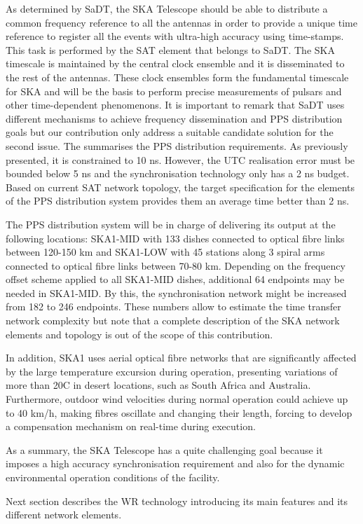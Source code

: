 As determined by SaDT, the SKA Telescope should be able to distribute a common frequency reference to all the antennas in order to provide a unique time reference to register all the events with ultra-high accuracy using time-stamps. This task is performed by the SAT element that belongs to SaDT. The SKA timescale is maintained by the central clock ensemble and it is disseminated to the rest of the antennas. These clock ensembles form the fundamental timescale for SKA and will be the basis to perform precise measurements of pulsars and other time-dependent phenomenons. It is important to remark that SaDT uses different mechanisms to achieve frequency dissemination and PPS distribution goals but our contribution only address a suitable candidate solution for the second issue. 
The \cite{paultests} summarises the PPS distribution requirements. As previously presented, it is constrained to 10 ns. However, the UTC realisation error must be bounded below 5 ns and the synchronisation technology only has a 2 ns budget. Based on current SAT network topology, the target specification for the elements of the PPS distribution system provides them an average time better than 2 ns. 

The PPS distribution system will be in charge of delivering its output at the following locations: SKA1-MID with 133 dishes connected to optical fibre links between 120-150 km and SKA1-LOW with 45 stations along 3 spiral arms connected to optical fibre links between 70-80 km. Depending on the frequency offset scheme applied to all SKA1-MID dishes, additional 64 endpoints may be needed in SKA1-MID. By this, the synchronisation network might be increased from 182 to 246 endpoints. These numbers allow to estimate the time transfer network complexity but note that a complete description of the SKA network elements and topology is out of the scope of this contribution.

In addition, SKA1 uses aerial optical fibre networks that are
significantly affected by the large temperature excursion during operation,
presenting variations of more than 20\degree C in desert locations, such as South Africa and Australia. Furthermore, outdoor wind velocities during normal operation could achieve up to 40 km/h, making fibres oscillate and changing their length, forcing to develop a compensation mechanism on real-time during execution. 

As a summary, the SKA Telescope has a quite challenging goal because it imposes a high accuracy synchronisation requirement and also for the dynamic environmental operation conditions of the facility.

Next section describes the WR technology introducing its main features and its different network elements.